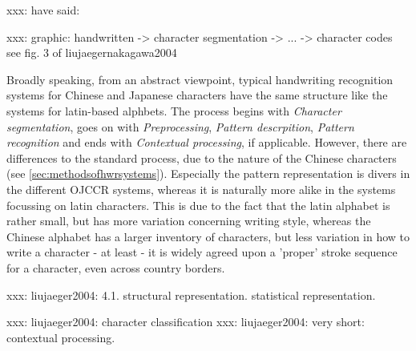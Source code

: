 xxx:  \cite{LiuJaegerNakagawa2004} have said: 

xxx:  graphic:
handwritten -> character segmentation -> ... -> character codes
see fig. 3 of liujaegernakagawa2004

Broadly speaking, from an abstract viewpoint, typical handwriting recognition 
systems for Chinese and Japanese characters have the same structure like the
systems for latin-based alphbets. The process begins with \emph{Character 
segmentation}, goes on with \emph{Preprocessing}, \emph{Pattern descrpition}, 
\emph{Pattern recognition} and ends with \emph{Contextual processing}, 
if applicable. However, there are differences to the standard process, due to 
the nature of the Chinese characters (see \ref{sec:methodsofhwrsystems}).
Especially the pattern representation is divers in the different OJCCR systems,
whereas it is naturally more alike in the systems focussing on latin characters.
This is due to the fact that the latin alphabet is rather small, but has more
variation concerning writing style, whereas the Chinese alphabet has a larger 
inventory of characters, but less variation in how to write a character - at
least - it is widely agreed upon a 'proper' stroke sequence for a character,
even across country borders.

xxx: liujaeger2004: 4.1. structural representation. statistical representation.

xxx: liujaeger2004: character classification
xxx: liujaeger2004: very short: contextual processing.




